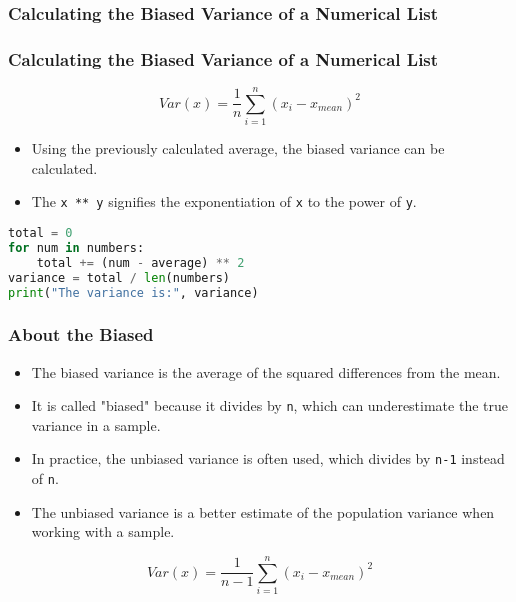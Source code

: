 \documentclass{beamer}
\begin{document}
    \subsubsection{Calculating the Biased Variance of a Numerical List}
    \begin{frame}[fragile]
        \frametitle{Calculating the Biased Variance of a Numerical List}
        \begin{equation*}
            Var(x) = \frac{1}{n}\sum_{i=1}^{n}(x_{i}-x_{mean})^{2}
        \end{equation*}
        \begin{itemize}
            \item Using the previously calculated average, the biased variance can be calculated.
            \item The \lstinline|x ** y| signifies the exponentiation of \lstinline|x| to the power of \lstinline|y|.
        \end{itemize}
        \begin{lstlisting}[language=Python]
total = 0
for num in numbers:
    total += (num - average) ** 2
variance = total / len(numbers)
print("The variance is:", variance)
        \end{lstlisting}
    \end{frame}
    \begin{frame}[fragile]
        \frametitle{About the Biased}
        \begin{itemize}
            \item The biased variance is the average of the squared differences from the mean.
            \item It is called "biased" because it divides by \lstinline|n|, which can underestimate the true variance in a sample.
            \item In practice, the unbiased variance is often used, which divides by \lstinline|n-1| instead of \lstinline|n|.
            \item The unbiased variance is a better estimate of the population variance when working with a sample.
        \end{itemize}
        \begin{equation*}
            Var(x) = \frac{1}{n-1}\sum_{i=1}^{n}(x_{i}-x_{mean})^{2}
        \end{equation*}
    \end{frame}
\end{document}
